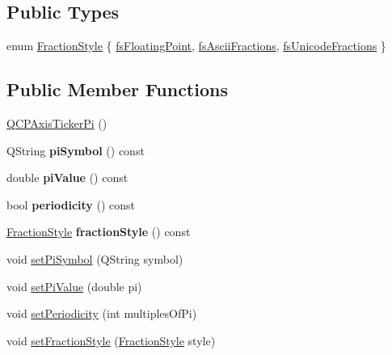 \subsection*{Public Types}
\begin{DoxyCompactItemize}
\item 
enum \hyperlink{classQCPAxisTickerPi_a262f1534c7f0c79a7d5237f5d1e2c54c}{Fraction\+Style} \{ \hyperlink{classQCPAxisTickerPi_a262f1534c7f0c79a7d5237f5d1e2c54ca00f097b669b2a0e22f508f1ae97877d8}{fs\+Floating\+Point}, 
\hyperlink{classQCPAxisTickerPi_a262f1534c7f0c79a7d5237f5d1e2c54ca05a5457e0e14cb726f623e25282066b3}{fs\+Ascii\+Fractions}, 
\hyperlink{classQCPAxisTickerPi_a262f1534c7f0c79a7d5237f5d1e2c54ca92f38a938c8b179b23363d9993681c55}{fs\+Unicode\+Fractions}
 \}
\end{DoxyCompactItemize}
\subsection*{Public Member Functions}
\begin{DoxyCompactItemize}
\item 
\hyperlink{classQCPAxisTickerPi_aa0d7b7034055927c0f0077a2d713d7d0}{Q\+C\+P\+Axis\+Ticker\+Pi} ()
\item 
Q\+String {\bfseries pi\+Symbol} () const \hypertarget{classQCPAxisTickerPi_aaf27b8fc9436c4682cc03a247898600f}{}\label{classQCPAxisTickerPi_aaf27b8fc9436c4682cc03a247898600f}

\item 
double {\bfseries pi\+Value} () const \hypertarget{classQCPAxisTickerPi_a536127262e22ecbc3b672b6f9478cd98}{}\label{classQCPAxisTickerPi_a536127262e22ecbc3b672b6f9478cd98}

\item 
bool {\bfseries periodicity} () const \hypertarget{classQCPAxisTickerPi_adc440aa474152b8a5b263456f45b5338}{}\label{classQCPAxisTickerPi_adc440aa474152b8a5b263456f45b5338}

\item 
\hyperlink{classQCPAxisTickerPi_a262f1534c7f0c79a7d5237f5d1e2c54c}{Fraction\+Style} {\bfseries fraction\+Style} () const \hypertarget{classQCPAxisTickerPi_a517f2e93f64d8bbadd96d4045ac81f2a}{}\label{classQCPAxisTickerPi_a517f2e93f64d8bbadd96d4045ac81f2a}

\item 
void \hyperlink{classQCPAxisTickerPi_acfdcd4758a393bde4be12a50fb2017b5}{set\+Pi\+Symbol} (Q\+String symbol)
\item 
void \hyperlink{classQCPAxisTickerPi_a36ce0651d2ec92edd36feac1619c2468}{set\+Pi\+Value} (double pi)
\item 
void \hyperlink{classQCPAxisTickerPi_a58f538dc01860fb56e46970e28a87f03}{set\+Periodicity} (int multiples\+Of\+Pi)
\item 
void \hyperlink{classQCPAxisTickerPi_a760c8af6ca68178e607556c4e5049d71}{set\+Fraction\+Style} (\hyperlink{classQCPAxisTickerPi_a262f1534c7f0c79a7d5237f5d1e2c54c}{Fraction\+Style} style)
\end{DoxyCompactItemize}
